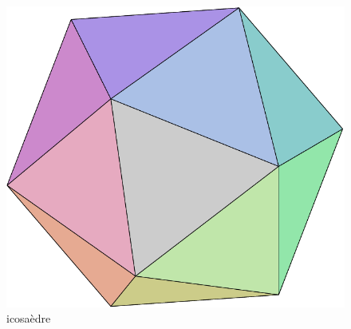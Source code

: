 \begin{figure}[ht]
   \centering
   \includegraphics[scale=0.25]{Eee09_3.pdf}
   \caption{icosaèdre}
   \label{fig:3}
\end{figure}

